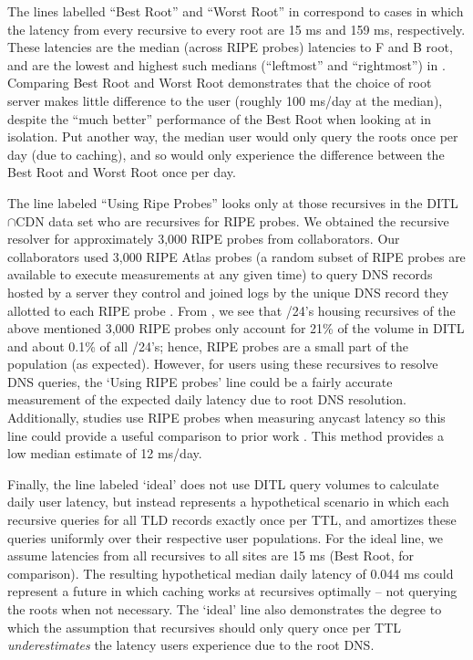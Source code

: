 \documentclass[sigconf,letterpaper,nonacm,10pt,anonymous]{acmart}
\begin{document}
The lines labelled ``Best Root'' and ``Worst Root'' in
 correspond to cases in which the
latency from every recursive to every root are 15 ms and 159 ms,
respectively. These latencies are the median (across RIPE probes)
latencies to F and B root, and are the lowest and highest such medians
(\ie ``leftmost'' and ``rightmost'') in .
Comparing Best Root and Worst Root demonstrates that the choice of root
server makes little difference to the user (roughly 100 ms/day at the
median), despite the ``much better'' performance of the Best Root when
looking at  in isolation. Put another way,
the median user would only query the roots once per day (due to
caching), and so would only experience the difference between the Best
Root and Worst Root once per day.

The line labeled ``Using Ripe Probes'' looks only at those recursives in
the DITL\(\cap\)CDN data set who are recursives for RIPE probes. We
obtained the recursive resolver for approximately 3,000 RIPE probes from
collaborators. Our collaborators used 3,000 RIPE Atlas probes (a random
subset of RIPE probes are available to execute measurements at any given
time) to query DNS records hosted by a server they control and joined
logs by the unique DNS record they allotted to each RIPE probe
\cite{lucas_ripe_potential}. From
, we see that /24's housing
recursives of the above mentioned 3,000 RIPE probes only account for
21\% of the volume in DITL and about 0.1\% of all /24's; hence, RIPE
probes are a small part of the population (as expected). However, for
users using these recursives to resolve DNS queries, the `Using RIPE
probes' line could be a fairly accurate measurement of the expected
daily latency due to root DNS resolution. Additionally, studies use RIPE
probes when measuring anycast latency so this line could provide a
useful comparison to prior work
\cite{colitti2006evaluating, de2017anycast, li_levin_spring_bhattacharjee_2018, mcquistin2019taming}.
This method provides a low median estimate of 12 ms/day.

Finally, the line labeled `ideal' does not use DITL query volumes to
calculate daily user latency, but instead represents a hypothetical
scenario in which each recursive queries for all TLD records exactly
once per TTL, and amortizes these queries uniformly over their
respective user populations. For the ideal line, we assume latencies
from all recursives to all sites are 15 ms (Best Root, for comparison).
The resulting hypothetical median daily latency of 0.044 ms could
represent a future in which caching works at recursives optimally -- not
querying the roots when not necessary. The `ideal' line also
demonstrates the degree to which the assumption that recursives should
only query once per TTL \emph{underestimates} the latency users
experience due to the root DNS.
\end{document}
